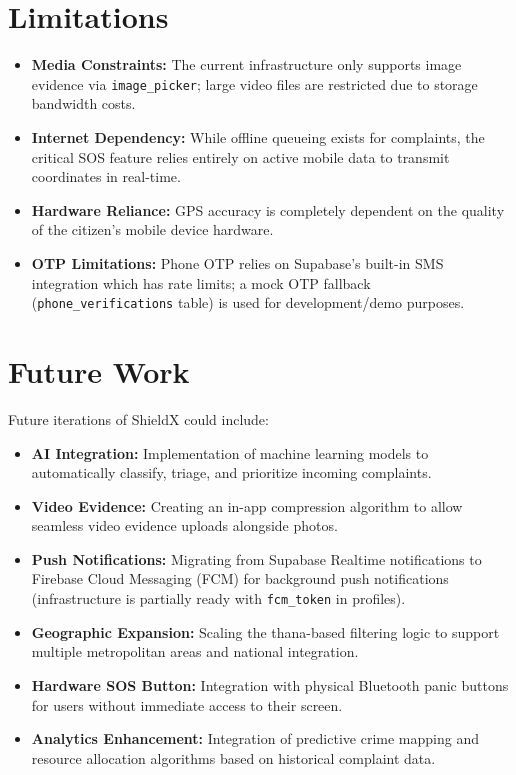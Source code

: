 \documentclass[11pt, a4paper]{report}
\begin{document}
\section{Limitations}
\begin{itemize}
    \item \textbf{Media Constraints:} The current infrastructure only supports image evidence via \texttt{image\_picker}; large video files are restricted due to storage bandwidth costs.
    \item \textbf{Internet Dependency:} While offline queueing exists for complaints, the critical SOS feature relies entirely on active mobile data to transmit coordinates in real-time.
    \item \textbf{Hardware Reliance:} GPS accuracy is completely dependent on the quality of the citizen's mobile device hardware.
    \item \textbf{OTP Limitations:} Phone OTP relies on Supabase's built-in SMS integration which has rate limits; a mock OTP fallback (\texttt{phone\_verifications} table) is used for development/demo purposes.
\end{itemize}

\section{Future Work}
Future iterations of ShieldX could include:
\begin{itemize}
    \item \textbf{AI Integration:} Implementation of machine learning models to automatically classify, triage, and prioritize incoming complaints.
    \item \textbf{Video Evidence:} Creating an in-app compression algorithm to allow seamless video evidence uploads alongside photos.
    \item \textbf{Push Notifications:} Migrating from Supabase Realtime notifications to Firebase Cloud Messaging (FCM) for background push notifications (infrastructure is partially ready with \texttt{fcm\_token} in profiles).
    \item \textbf{Geographic Expansion:} Scaling the thana-based filtering logic to support multiple metropolitan areas and national integration.
    \item \textbf{Hardware SOS Button:} Integration with physical Bluetooth panic buttons for users without immediate access to their screen.
    \item \textbf{Analytics Enhancement:} Integration of predictive crime mapping and resource allocation algorithms based on historical complaint data.
\end{itemize}
\end{document}
